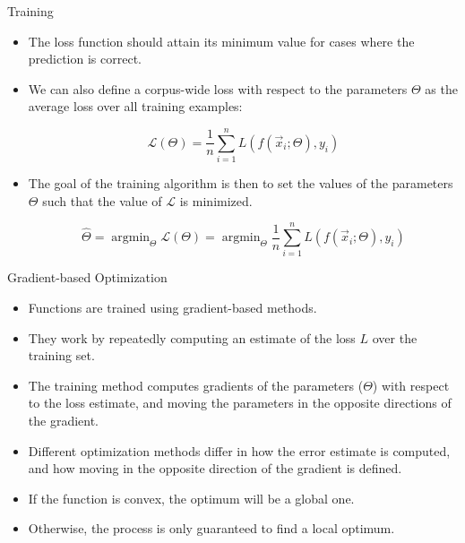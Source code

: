 \documentclass[handout]{beamer}
\begin{document}
\begin{frame}{Training}
\begin{scriptsize}
\begin{itemize}
\item The loss function should attain its minimum value for cases where the prediction is correct.

\item We can also define a corpus-wide loss with respect to the parameters $\Theta$ as the average loss over all training examples:

\begin{displaymath}
 \mathcal{L}(\Theta) = \frac{1}{n} \sum_{i=1}^n L(f(\vec{x}_i;\Theta), y_i)
\end{displaymath}

\item The goal of the training algorithm is then to set the values of the parameters $\Theta$  such that the value of $\mathcal{L}$ is minimized.


\begin{displaymath}
 \hat{\Theta} = \operatorname{argmin}_{\Theta} \mathcal{L}(\Theta) =  \operatorname{argmin}_{\Theta} \frac{1}{n} \sum_{i=1}^n L(f(\vec{x}_i;\Theta), y_i)
\end{displaymath}


\end{itemize}


\end{scriptsize}
\end{frame}



\begin{frame}{Gradient-based Optimization}
\begin{scriptsize}
\begin{itemize}
\item Functions are trained using  gradient-based methods.

\item They work by repeatedly computing an estimate of the loss $L$ over the training set.



\item The training method computes gradients of the parameters ($\Theta$)  with respect to the loss estimate, and moving the parameters in the opposite directions of the gradient. 

\item Different optimization methods differ in how the error estimate is computed, and how moving in the opposite direction of the gradient is defined.

\item If the function is convex, the optimum will be a global one.

\item Otherwise, the process is only guaranteed to find a local optimum.


\end{itemize}


\end{scriptsize}
\end{frame}
\end{document}
